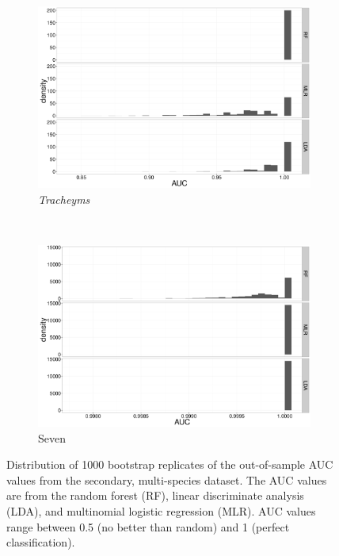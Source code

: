 \documentclass[12pt,letterpaper]{article}
\begin{document}
\begin{figure}[ht]
  \centering
  \begin{subfigure}[h]{0.8\linewidth}
    \includegraphics[height = 0.8\textheight, width = \textwidth, keepaspectratio = true]{figure/trach_boot}
    \caption{\textit{Tracheyms}}
    \label{fig:trach_boot}
  \end{subfigure}
  \\
  \begin{subfigure}[h]{0.8\linewidth}
    \includegraphics[height = 0.8\textheight, width = \textwidth, keepaspectratio = true]{figure/seven_boot}
    \caption{Seven}
    \label{fig:seven_boot}
  \end{subfigure}
  \caption{Distribution of 1000 bootstrap replicates of the out-of-sample AUC values from the secondary, multi-species dataset. The AUC values are from the random forest (RF), linear discriminate analysis (LDA), and multinomial logistic regression (MLR). AUC values range between 0.5 (no better than random) and 1 (perfect classification).}
  \label{fig:other_boot}
\end{figure}
\end{document}
